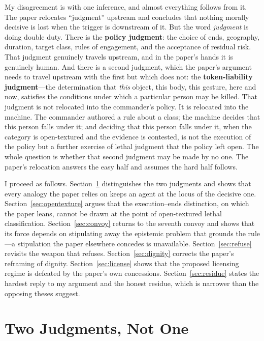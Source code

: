 \documentclass[11pt]{article}
\begin{document}
My disagreement is with one inference, and almost everything follows from it. The paper relocates ``judgment'' upstream and concludes that nothing morally decisive is lost when the trigger is downstream of it. But the word \emph{judgment} is doing double duty. There is the \textbf{policy judgment}: the choice of ends, geography, duration, target class, rules of engagement, and the acceptance of residual risk. That judgment genuinely travels upstream, and in the paper's hands it is genuinely human. And there is a second judgment, which the paper's argument needs to travel upstream with the first but which does not: the \textbf{token-liability judgment}---the determination that \emph{this} object, this body, this gesture, here and now, satisfies the conditions under which a particular person may be killed. That judgment is not relocated into the commander's policy. It is relocated into the machine. The commander authored a rule about a class; the machine decides that this person falls under it; and deciding that this person falls under it, when the category is open-textured and the evidence is contested, is not the execution of the policy but a further exercise of lethal judgment that the policy left open. The whole question is whether that second judgment may be made by no one. The paper's relocation answers the easy half and assumes the hard half follows.

I proceed as follows. Section~\ref{sec:two} distinguishes the two judgments and shows that every analogy the paper relies on keeps an agent at the locus of the decisive one. Section~\ref{sec:opentexture} argues that the execution--ends distinction, on which the paper leans, cannot be drawn at the point of open-textured lethal classification. Section~\ref{sec:convoy} returns to the seventh convoy and shows that its force depends on stipulating away the epistemic problem that grounds the rule---a stipulation the paper elsewhere concedes is unavailable. Section~\ref{sec:refuse} revisits the weapon that refuses. Section~\ref{sec:dignity} corrects the paper's reframing of dignity. Section~\ref{sec:license} shows that the proposed licensing regime is defeated by the paper's own concessions. Section~\ref{sec:residue} states the hardest reply to my argument and the honest residue, which is narrower than the opposing theses suggest.

\section{Two Judgments, Not One}
\label{sec:two}
\end{document}
